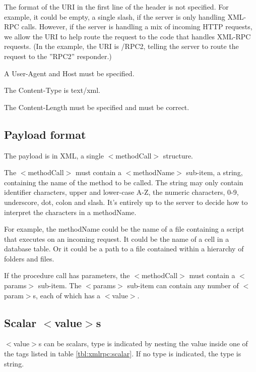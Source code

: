 The format of the URI in the first line of the header is not specified. For example, it could be empty, a single slash, if the server is only handling XML-RPC calls. However, if the server is handling a mix of incoming HTTP requests, we allow the URI to help route the request to the code that handles XML-RPC requests. (In the example, the URI is /RPC2, telling the server to route the request to the ''RPC2'' responder.)

\begin{itemize_compact}
	\item A User-Agent and Host must be specified.
	\item The Content-Type is text/xml.
	\item The Content-Length must be specified and must be correct.
\end{itemize_compact}


\subsection{Payload format}

The payload is in XML, a single $<$methodCall$>$ structure.

The $<$methodCall$>$ must contain a $<$methodName$>$ sub-item, a string, containing the name of the method to be called. The string may only contain identifier characters, upper and lower-case A-Z, the numeric characters, 0-9, underscore, dot, colon and slash. It's entirely up to the server to decide how to interpret the characters in a methodName.

For example, the methodName could be the name of a file containing a script that executes on an incoming request. It could be the name of a cell in a database table. Or it could be a path to a file contained within a hierarchy of folders and files.

If the procedure call has parameters, the $<$methodCall$>$ must contain a $<$params$>$ sub-item. The $<$params$>$ sub-item can contain any number of $<$param$>$s, each of which has a $<$value$>$.

\subsection{Scalar $<$value$>$s}

$<$value$>$s can be scalars, type is indicated by nesting the value inside one of the tags listed in table \ref{tbl:xmlrpc:scalar}.
If no type is indicated, the type is string.

